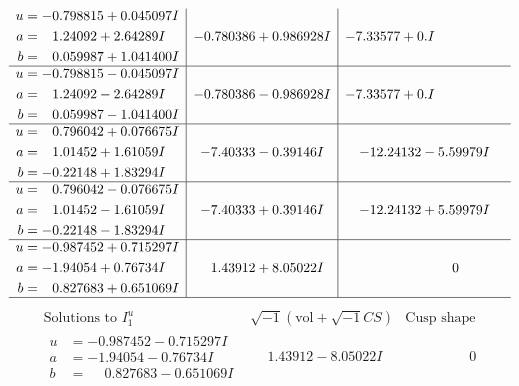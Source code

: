 \documentclass[1p]{elsarticle_modified}
\theoremstyle{definition}
\newcommand{\I}{\sqrt{-1}}
\begin{document}
$$\begin{array}{c|c|c}
\begin{aligned}
u &= -0.798815 + 0.045097 I \\
a &= \phantom{-}1.24092 + 2.64289 I \\
b &= \phantom{-}0.059987 + 1.041400 I\end{aligned}
 & -0.780386 + 0.986928 I & -7.33577 + 0. I\phantom{ +0.000000I} \\ \hline\begin{aligned}
u &= -0.798815 - 0.045097 I \\
a &= \phantom{-}1.24092 - 2.64289 I \\
b &= \phantom{-}0.059987 - 1.041400 I\end{aligned}
 & -0.780386 - 0.986928 I & -7.33577 + 0. I\phantom{ +0.000000I} \\ \hline\begin{aligned}
u &= \phantom{-}0.796042 + 0.076675 I \\
a &= \phantom{-}1.01452 + 1.61059 I \\
b &= -0.22148 + 1.83294 I\end{aligned}
 & -7.40333 - 0.39146 I & -12.24132 - 5.59979 I \\ \hline\begin{aligned}
u &= \phantom{-}0.796042 - 0.076675 I \\
a &= \phantom{-}1.01452 - 1.61059 I \\
b &= -0.22148 - 1.83294 I\end{aligned}
 & -7.40333 + 0.39146 I & -12.24132 + 5.59979 I \\ \hline\begin{aligned}
u &= -0.987452 + 0.715297 I \\
a &= -1.94054 + 0.76734 I \\
b &= \phantom{-}0.827683 + 0.651069 I\end{aligned}
 & \phantom{-}1.43912 + 8.05022 I & \phantom{-0.000000 } 0\\
 \hline 
 \end{array}$$\newpage$$\begin{array}{c|c|c}  
\text{Solutions to }I^u_{1}& \I (\text{vol} + \sqrt{-1}CS) & \text{Cusp shape}\\
 \hline 
\begin{aligned}
u &= -0.987452 - 0.715297 I \\
a &= -1.94054 - 0.76734 I \\
b &= \phantom{-}0.827683 - 0.651069 I\end{aligned}
 & \phantom{-}1.43912 - 8.05022 I & \phantom{-0.000000 } 0 \\ \hline\begin{aligned}

\end{aligned}
\end{array}$$
\end{document}
